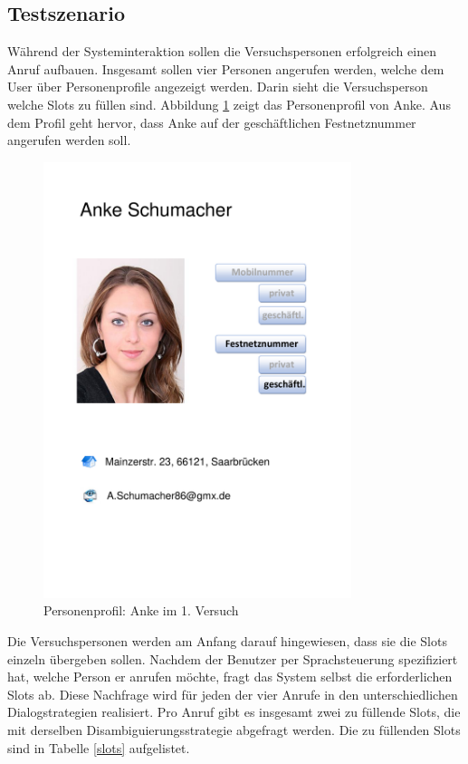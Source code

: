 \documentclass[12pt,a4paper]{scrartcl}
\begin{document}
\subsection{Testszenario}
\label{testszenario1}
Während der Systeminteraktion sollen die Versuchspersonen erfolgreich einen Anruf aufbauen. Insgesamt sollen vier Personen angerufen werden, welche dem User über Personenprofile angezeigt werden.  Darin sieht die Versuchsperson welche Slots zu füllen sind. Abbildung \ref{anke} zeigt das Personenprofil von Anke. Aus dem Profil geht hervor, dass Anke auf der geschäftlichen Festnetznummer angerufen werden soll. 
\begin{figure}[H]
\begin{center}
\includegraphics[width=9cm]{Anke.pdf}
\caption{Personenprofil: Anke im 1. Versuch}
\label{anke}
\end{center}
\end{figure}
Die Versuchspersonen werden am Anfang darauf hingewiesen, dass sie die Slots einzeln übergeben sollen. Nachdem der Benutzer per Sprachsteuerung spezifiziert hat, welche Person er anrufen möchte, fragt das System selbst die erforderlichen Slots ab. Diese Nachfrage wird für jeden der vier Anrufe in den unterschiedlichen Dialogstrategien realisiert. Pro Anruf gibt es insgesamt zwei zu füllende Slots, die mit derselben Disambiguierungsstrategie abgefragt werden. Die zu füllenden Slots sind in Tabelle \ref{slots} aufgelistet.
\end{document}
